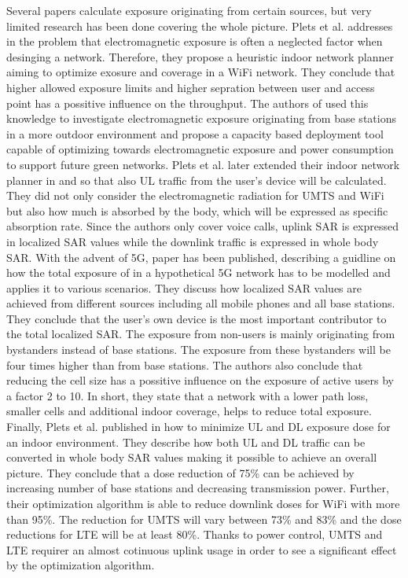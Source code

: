 Several papers calculate exposure originating from certain sources, but very  limited research has been done covering the whole picture.
Plets et al. addresses in \cite{J6_originalExposureFormula} the problem that electromagnetic exposure is often a neglected 
factor when desinging a network. Therefore, they propose a heuristic indoor network planner aiming to optimize
exosure and coverage in a WiFi network. They conclude that higher allowed exposure limits and higher sepration between user and access point 
has a possitive influence on the throughput.
The authors of \cite{J1} used this knowledge 
to investigate electromagnetic exposure originating from base stations in a more outdoor environment
and propose a capacity based deployment tool capable of optimizing towards electromagnetic exposure and power consumption to support future green networks.
Plets et al. later extended their indoor network planner in \cite{J10_RDP} and \cite{J10.1} so that also  
\gls{UL} traffic from the user's device will be calculated. 
They did not only consider the electromagnetic radiation for \gls{UMTS} and WiFi
but also how much is absorbed by the body, which will be expressed as specific absorption rate. 
Since the authors only cover voice calls,
uplink SAR is expressed in localized SAR values while the downlink traffic is expressed in whole body SAR.
 With the advent of 5G, paper \cite{J17_kuehn2019modelling} has been 
published, describing a guidline on how the total exposure of in a hypothetical 5G network has to be modelled and applies it 
to various scenarios.
They discuss how localized SAR values are achieved from different sources including all mobile phones and all base stations.
They conclude that the user's own device is the most important contributor to the total localized SAR. 
The exposure from non-users is mainly originating from bystanders instead of base stations. The exposure 
from these bystanders will be four times higher than from base stations.
The authors also conclude that reducing the cell size has a possitive influence on the exposure of active users by 
a factor 2 to 10.
In short, they state that a network with a lower path
loss, smaller cells and additional indoor coverage, helps to reduce total exposure.
Finally, Plets et al. published in \cite{J22_plets2015joint} how 
to minimize \gls{UL} and \gls{DL} exposure dose for an indoor environment. They describe how both \gls{UL} and \gls{DL} traffic 
can be converted in whole body SAR values making it possible to achieve an overall picture.
They conclude that a dose reduction of 75\% can be achieved by increasing number of base stations and decreasing transmission power.
Further, their optimization algorithm is able to reduce downlink doses for WiFi with more than
95\%. The reduction for \gls{UMTS} will vary between 73\% and 83\% and 
 the dose reductions for  \gls{LTE}  will be at least 80\%.
Thanks to power control, \gls{UMTS} and \gls{LTE} requirer an almost cotinuous uplink usage in order to 
see a significant effect by the optimization algorithm.

